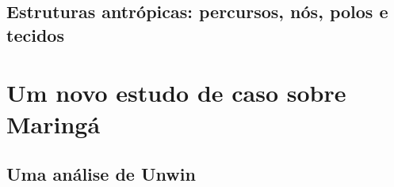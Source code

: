 \documentclass[]{report}
\begin{document}
\section{Estruturas antrópicas: percursos, nós, polos e tecidos}

\chapter{Um novo estudo de caso sobre Maringá}
	\section{Uma análise de Unwin}
\end{document}
